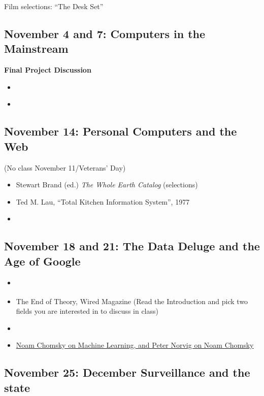 Film selections: ``The Desk Set''

\subsection{November 4 and 7: Computers in the Mainstream}

\textbf{Final Project Discussion}

\begin{itemize}
\item
  \cite[Selections]{miller_assault_1971}
\item
  \cite{kidder_soul_1981}
\end{itemize}

\subsection{November 14: Personal Computers and the Web}

(No class November 11/Veterans' Day)

\begin{itemize}
\item
  Stewart Brand (ed.) \emph{The Whole Earth Catalog} (selections)
\item
  Ted M. Lau, ``Total Kitchen Information System'', 1977
\item
  \cite[Introduction; Chapters 1, 2, and 3]{berners-lee_weaving_1999}
\end{itemize}

\subsection{November 18 and 21: The Data Deluge and the Age of Google}

\begin{itemize}
\item
  \cite["After the Deluge"]{gleick:_information_2011}
\item
  The End of Theory, Wired Magazine (Read the Introduction and pick two
  fields you are interested in to discuss in class)
\item
  \cite[Chapter 2]{vaidhyanathan_googlization_2011}
\item
  \href{http://norvig.com/chomsky.html}{Noam Chomsky on Machine
  Learning, and Peter Norvig on Noam Chomsky}
\end{itemize}

\subsection{November 25: December Surveillance and the state}


